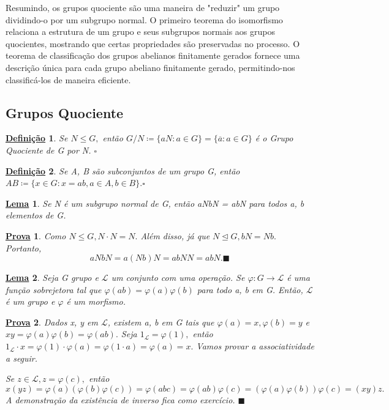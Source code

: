 \documentclass{article}
\newtheorem*{def*}{\underline{Defini\c c\~ao}}
\newtheorem*{proof*}{\underline{Prova}}
\newtheorem*{lemma*}{\underline{Lema}}
\renewcommand\qedsymbol{$\blacksquare$}
\begin{document}
Resumindo, os grupos quociente s\~{a}o uma maneira de "reduzir" um grupo dividindo-o por um subgrupo normal. O primeiro teorema
do isomorfismo relaciona a estrutura de um grupo e seus subgrupos normais aos grupos quocientes, mostrando que certas 
propriedades s\~{a}o preservadas no processo. O teorema de classifica\c{c}\~{a}o dos grupos abelianos finitamente gerados
fornece uma descri\c{c}\~{a}o \'{u}nica para cada grupo abeliano finitamente gerado, permitindo-nos classific\'{a}-los de 
maneira eficiente.

\subsection{Grupos Quociente}
\begin{def*}
  Se $N\leq{G},$ ent\~ao $G/N\coloneqq\{aN: a\in G\}=\{\overline{a}: a\in G\}$ \'e o Grupo Quociente de G por N. $\square$
\end{def*}
\begin{def*}
  Se A, B s\~ao subconjuntos de um grupo G, ent\~ao $AB\coloneqq\{x\in G: x=ab, a\in A, b\in B\}.\square$
\end{def*}
\begin{lemma*}
  Se N \'e um subgrupo normal de G, ent\~ao aNbN = abN para todos a, b elementos de G.
\end{lemma*}
\begin{proof*}
  Como $N\leq{G}, N \cdot N = N.$ Al\'em disso, j\'a que $N\trianglelefteq{G}, bN = Nb.$ Portanto, 
    $$
    aNbN = a(Nb)N = abNN = abN. \text{\qedsymbol}
    $$ 
\end{proof*}
\begin{lemma*}
  Seja G grupo e $\mathcal{L}$ um conjunto com uma opera\c c\~ao. Se $\varphi:G\rightarrow \mathcal{L}$ \'e uma fun\c c\~ao
  sobrejetora tal que $\varphi(ab)=\varphi(a)\varphi(b)$ para todo a, b em G. Ent\~ao, $\mathcal{L}$ \'e um grupo e $\varphi$ \'e
  um morfismo.
\end{lemma*}
\begin{proof*}
  Dados x, y em $\mathcal{L}$, existem a, b em G tais que $\varphi(a)=x, \varphi(b)=y$ e $xy = \varphi(a)\varphi(b)=\varphi(ab).$
  Seja $1_{\mathcal{L}}=\varphi(1),$ ent\~ao $1_{\mathcal{L}}\cdot x=\varphi(1)\cdot \varphi(a) = \varphi(1 \cdot a) = \varphi(a)=x.$
  Vamos provar a associatividade a seguir.

  Se $z\in \mathcal{L}, z=\varphi(c),$ ent\~ao 
    $$
      x(yz)=\varphi(a)(\varphi(b)\varphi(c)) = \varphi(abc)=\varphi(ab)\varphi(c)=(\varphi(a)\varphi(b))\varphi(c) = (xy)z.
    $$
  A demonstra\c c\~ao da exist\^encia de inverso fica como exerc\'icio. \qedsymbol
\end{proof*}
\end{document}
